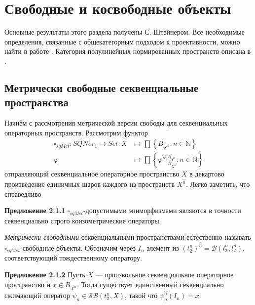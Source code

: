 \documentclass[12pt]{article}
\begin{document}
\section{Свободные и косвободные объекты}

Основные результаты этого раздела получены С. Штейнером. Все необходимые определения, связанные с общекатегорным подходом к проективности, можно найти в работе \cite{HelMetrFrQmod}. Категория полулинейных нормированных пространств описана в \cite{ShteinerTopFr}.

\subsection{Метрически свободные секвенциальные пространства}

Начнём с рассмотрения метрической версии свободы для секвенциальных операторных пространств. Рассмотрим функтор 
$$
\begin{aligned}
\square_{sqMet} : SQNor_1 \to Set : X&\mapsto\prod\left\{ B_{X^{\wideparen{n}}}:n \in \mathbb{N}\right\}\\
\varphi&\mapsto \prod\left\{\varphi^{\wideparen{n}}|_{B_{X^{\wideparen{n}}}}^{B_{Y^{\wideparen{n}}}}:n\in\mathbb{N}\right\}
\end{aligned}
$$
отправляющий  секвенциальное операторное пространство $X$ в декартово произведение единичных шаров каждого из пространств $X^{\wideparen{n}}$. Легко заметить, что справедливо

{\bf Предложение 2.1.1} $\square_{sqMet}$-допустимыми эпиморфизмами являются в точности секвенциально строго коизометрические операторы.

\medskip


\textit{Метрически свободными} секвенциальными пространствами естественно называть $\square_{sqMet}$-свободные объекты. Обозначим через $I_n$ элемент из $(t_2^n)^{\wideparen{n}} = \mathcal{B}(l_2^n, l_2^n)$, соответствующий тождественному оператору.

\medskip

{\bf Предложение 2.1.2} Пусть $X$ --- произвольное секвенциальное операторное пространство и $x \in B_{X^{\wideparen{n}}}$. Тогда существует единственный секвенциально сжимающий оператор 
$\psi_n \in \mathcal{SB}(t_2^n, X)$, такой что $\psi_n^{\wideparen{n}}(I_n) = x$.
\end{document}
